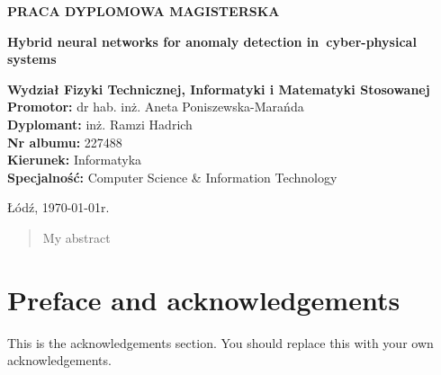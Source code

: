 \pagestyle{empty}
\begin{center}

{\large \textbf{PRACA DYPLOMOWA MAGISTERSKA}}
\vspace{6cm}

{\fontsize{18}{18}\selectfont \textbf{Hybrid neural networks for anomaly detection in~cyber-physical systems}}
\end{center}
\normalsize
\vspace{6cm}
\textbf{Wydział Fizyki Technicznej, Informatyki i Matematyki Stosowanej \\
Promotor:} dr hab. inż. Aneta Poniszewska-Marańda\\
\textbf{Dyplomant:} inż. Ramzi Hadrich\\
\textbf{Nr albumu:} 227488\\
\textbf{Kierunek:} Informatyka\\
\textbf{Specjalność:} Computer Science \& Information Technology\\
\begin{center}
    Łódź, \today r.
\end{center}


\cleardoublepage
\begin{abstract}
    My abstract
\end{abstract}


% 

\cleardoublepage

\section*{Preface and acknowledgements}

This is the acknowledgements section.  You should replace this with your
own acknowledgements.

